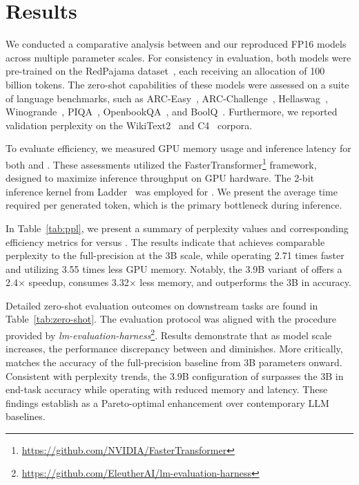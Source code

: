 \section{Results}

We conducted a comparative analysis between  and our reproduced FP16  models across multiple parameter scales. For consistency in evaluation, both models were pre-trained on the RedPajama dataset~\cite{redpajama}, each receiving an allocation of 100 billion tokens. The zero-shot capabilities of these models were assessed on a suite of language benchmarks, such as ARC-Easy~\cite{arc}, ARC-Challenge~\cite{arc}, Hellaswag~\cite{hellaswag}, Winogrande~\cite{winoGrande}, PIQA~\cite{piqa}, OpenbookQA~\cite{openbookqa}, and BoolQ~\cite{boolq}. Furthermore, we reported validation perplexity on the WikiText2~\cite{wikitext2} and C4~\cite{c4} corpora.

To evaluate efficiency, we measured GPU memory usage and inference latency for both  and . These assessments utilized the FasterTransformer\footnote{\url{https://github.com/NVIDIA/FasterTransformer}} framework, designed to maximize inference throughput on GPU hardware. The 2-bit inference kernel from Ladder~\cite{ladder} was employed for . We present the average time required per generated token, which is the primary bottleneck during inference.

In Table~\ref{tab:ppl}, we present a summary of perplexity values and corresponding efficiency metrics for  versus . The results indicate that  achieves comparable perplexity to the full-precision  at the 3B scale, while operating 2.71 times faster and utilizing 3.55 times less GPU memory. Notably, the 3.9B variant of  offers a 2.4$\times$ speedup, consumes 3.32$\times$ less memory, and outperforms the 3B  in accuracy.

Detailed zero-shot evaluation outcomes on downstream tasks are found in Table~\ref{tab:zero-shot}. The evaluation protocol was aligned with the procedure provided by \emph{lm-evaluation-harness}\footnote{\url{https://github.com/EleutherAI/lm-evaluation-harness}}. Results demonstrate that as model scale increases, the performance discrepancy between  and  diminishes. More critically,  matches the accuracy of the full-precision baseline from 3B parameters onward. Consistent with perplexity trends, the 3.9B configuration of  surpasses the 3B  in end-task accuracy while operating with reduced memory and latency. These findings establish  as a Pareto-optimal enhancement over contemporary LLM baselines.

